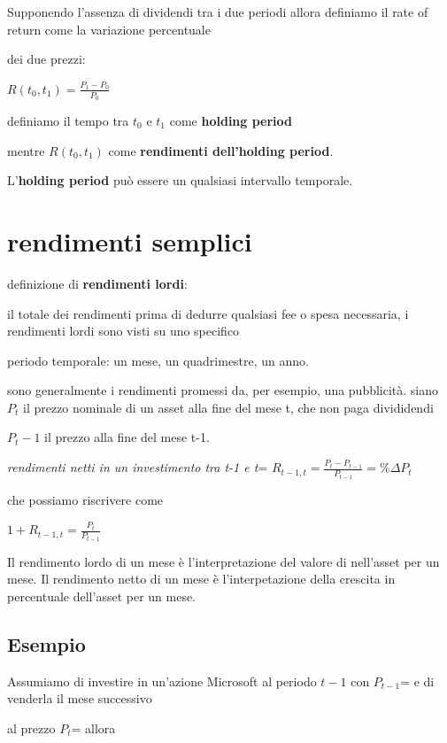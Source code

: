 \documentclass[a4paper,11pt]{report}
\begin{document}
{	Supponendo l'assenza di dividendi tra i due periodi allora definiamo il rate of return come la variazione percentuale

	dei due prezzi:
\begin{center}
	$R(t_0,t_1)={\frac {P_1-P_0}{P_0}}$
\end{center}
	definiamo il tempo tra $t_0$ e $t_1$ come \textbf{holding period}  

	mentre $R(t_0,t_1)$ come \textbf{rendimenti dell'holding period}.

	L'\textbf{holding period} può essere un qualsiasi intervallo temporale.

\section{rendimenti semplici}
	definizione di \textbf{rendimenti lordi}:

	il totale dei rendimenti prima di dedurre qualsiasi fee o spesa necessaria, i rendimenti lordi sono visti su uno specifico

	periodo temporale: un mese, un quadrimestre, un anno. 

	sono generalmente i rendimenti promessi da, per esempio, una pubblicità. \newline
 	siano $P_t$ il prezzo nominale di un asset alla fine del mese t, che non paga divididendi

	$P_t-1$ il prezzo alla fine del mese t-1. \newline

\begin{center}
	{\emph{rendimenti netti in un investimento tra t-1 e t}}= $R_{t-1,t}={\frac {P_t - P_{t-1}}{P_{t-1}}}= \%\Delta P_t$
\end{center}	
	che possiamo riscrivere come
\begin{center}
 	$1+R_{t-1,t}={\frac {P_t}{P_{t-1}}}$
\end{center}
	Il rendimento lordo di un mese è l'interpretazione del valore di {} nell'asset per un mese.\newline
	Il rendimento netto di un mese è l'interpetazione della crescita in percentuale dell'asset per un mese.
\subsection{Esempio}
	Assumiamo di investire in un'azione Microsoft al periodo $t-1$ con $P_{t-1}$={} e di venderla il mese successivo

	al prezzo $P_t$={} allora
	
}
\end{document}

